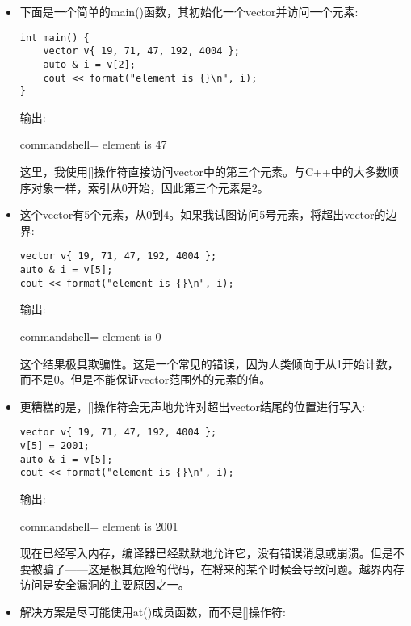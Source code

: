 \begin{itemize}
\item 
下面是一个简单的main()函数，其初始化一个vector并访问一个元素:

\begin{lstlisting}[style=styleCXX]
int main() {
	vector v{ 19, 71, 47, 192, 4004 };
	auto & i = v[2];
	cout << format("element is {}\n", i);
}
\end{lstlisting}

输出:

\begin{tcblisting}{commandshell={}}
element is 47
\end{tcblisting}

这里，我使用[]操作符直接访问vector中的第三个元素。与C++中的大多数顺序对象一样，索引从0开始，因此第三个元素是2。

\item 
这个vector有5个元素，从0到4。如果我试图访问5号元素，将超出vector的边界:

\begin{lstlisting}[style=styleCXX]
vector v{ 19, 71, 47, 192, 4004 };
auto & i = v[5];
cout << format("element is {}\n", i);
\end{lstlisting}

输出:

\begin{tcblisting}{commandshell={}}
element is 0
\end{tcblisting}

这个结果极具欺骗性。这是一个常见的错误，因为人类倾向于从1开始计数，而不是0。但是不能保证vector范围外的元素的值。

\item 
更糟糕的是，[]操作符会无声地允许对超出vector结尾的位置进行写入:

\begin{lstlisting}[style=styleCXX]
vector v{ 19, 71, 47, 192, 4004 };
v[5] = 2001;
auto & i = v[5];
cout << format("element is {}\n", i);
\end{lstlisting}

输出:

\begin{tcblisting}{commandshell={}}
element is 2001
\end{tcblisting}

现在已经写入内存，编译器已经默默地允许它，没有错误消息或崩溃。但是不要被骗了——这是极其危险的代码，在将来的某个时候会导致问题。越界内存访问是安全漏洞的主要原因之一。

\item 
解决方案是尽可能使用at()成员函数，而不是[]操作符:


\end{itemize}
